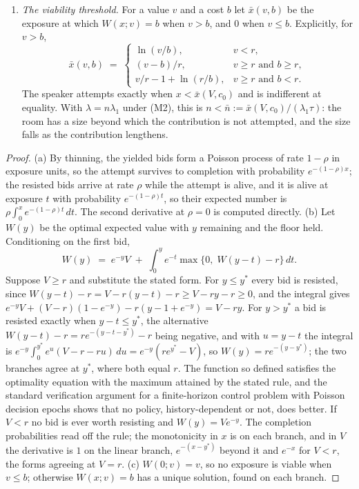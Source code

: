 \begin{proposition}
\begin{enumerate}[label=(\alph*)]
\item \emph{The viability threshold.} For a value $v$ and a cost $b$ let $\bar{x}(v, b)$ be the exposure at which $W(x; v) = b$ when $v > b$, and $0$ when $v \le b$. Explicitly, for $v > b$,
\[
\bar{x}(v, b) \;=\; \begin{cases} \ln (v/b), & v < r,\\[2pt] (v - b)/r, & v \ge r \text{ and } b \ge r,\\[2pt] v/r - 1 + \ln (r/b), & v \ge r \text{ and } b < r.\end{cases}
\]
The speaker attempts exactly when $x < \bar{x}(V, c_0)$ and is indifferent at equality. With $\lambda = n\lambda_1$ under (M2), this is $n < \bar{n} := \bar{x}(V, c_0)/(\lambda_1\tau)$: the room has a size beyond which the contribution is not attempted, and the size falls as the contribution lengthens.
\end{enumerate}
\end{proposition}

\begin{proof}
(a) By thinning, the yielded bids form a Poisson process of rate $1-\rho$ in exposure units, so the attempt survives to completion with probability $e^{-(1-\rho)x}$; the resisted bids arrive at rate $\rho$ while the attempt is alive, and it is alive at exposure $t$ with probability $e^{-(1-\rho)t}$, so their expected number is $\rho\int_0^x e^{-(1-\rho)t}\,dt$. The second derivative at $\rho = 0$ is computed directly. (b) Let $W(y)$ be the optimal expected value with $y$ remaining and the floor held. Conditioning on the first bid,
\[
W(y) \;=\; e^{-y}V \;+\; \int_0^y e^{-t}\max\{0,\; W(y-t) - r\}\,dt .
\]
Suppose $V \ge r$ and substitute the stated form. For $y \le y^{*}$ every bid is resisted, since $W(y-t) - r = V - r(y-t) - r \ge V - ry - r \ge 0$, and the integral gives $e^{-y}V + (V-r)(1 - e^{-y}) - r(y - 1 + e^{-y}) = V - ry$. For $y > y^{*}$ a bid is resisted exactly when $y - t \le y^{*}$, the alternative $W(y-t) - r = r e^{-(y-t-y^{*})} - r$ being negative, and with $u = y - t$ the integral is $e^{-y}\int_0^{y^{*}} e^{u}(V - r - ru)\,du = e^{-y}(re^{y^{*}} - V)$, so $W(y) = re^{-(y-y^{*})}$; the two branches agree at $y^{*}$, where both equal $r$. The function so defined satisfies the optimality equation with the maximum attained by the stated rule, and the standard verification argument for a finite-horizon control problem with Poisson decision epochs shows that no policy, history-dependent or not, does better. If $V < r$ no bid is ever worth resisting and $W(y) = Ve^{-y}$. The completion probabilities read off the rule; the monotonicity in $x$ is on each branch, and in $V$ the derivative is $1$ on the linear branch, $e^{-(x-y^{*})}$ beyond it and $e^{-x}$ for $V < r$, the forms agreeing at $V = r$. (c) $W(0; v) = v$, so no exposure is viable when $v \le b$; otherwise $W(x; v) = b$ has a unique solution, found on each branch.
\end{proof}

